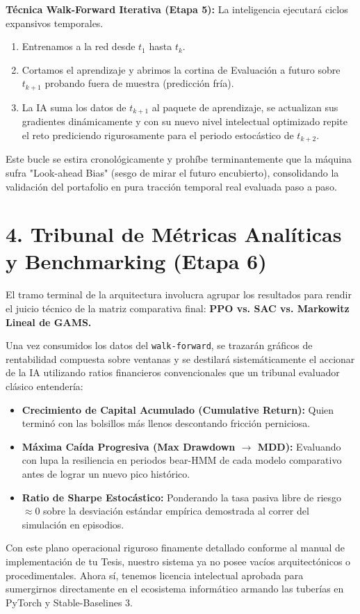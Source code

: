 \documentclass[11pt,a4paper]{article}
\begin{document}
\textbf{Técnica Walk-Forward Iterativa (Etapa 5):}
La inteligencia ejecutará ciclos expansivos temporales. 
\begin{enumerate}
    \item Entrenamos a la red desde $t_1$ hasta $t_k$.
    \item Cortamos el aprendizaje y abrimos la cortina de Evaluación a futuro sobre $t_{k+1}$ probando fuera de muestra (predicción fría).
    \item La IA suma los datos de $t_{k+1}$ al paquete de aprendizaje, se actualizan sus gradientes dinámicamente y con su nuevo nivel intelectual optimizado repite el reto prediciendo rigurosamente para el periodo estocástico de $t_{k+2}$.
\end{enumerate}
Este bucle se estira cronológicamente y prohíbe terminantemente que la máquina sufra "Look-ahead Bias" (sesgo de mirar el futuro encubierto), consolidando la validación del portafolio en pura tracción temporal real evaluada paso a paso.

\section{4. Tribunal de Métricas Analíticas y Benchmarking (Etapa 6)}
El tramo terminal de la arquitectura involucra agrupar los resultados para rendir el juicio técnico de la matriz comparativa final: \textbf{PPO vs. SAC vs. Markowitz Lineal de GAMS.}

Una vez consumidos los datos del \texttt{walk-forward}, se trazarán gráficos de rentabilidad compuesta sobre ventanas y se destilará sistemáticamente el accionar de la IA utilizando ratios financieros convencionales que un tribunal evaluador clásico entendería:
\begin{itemize}
    \item \textbf{Crecimiento de Capital Acumulado (Cumulative Return):} Quien terminó con las bolsillos más llenos descontando fricción perniciosa.
    \item \textbf{Máxima Caída Progresiva (Max Drawdown $\rightarrow$ MDD):} Evaluando con lupa la resiliencia en periodos bear-HMM de cada modelo comparativo antes de lograr un nuevo pico histórico.
    \item \textbf{Ratio de Sharpe Estocástico:} Ponderando la tasa pasiva libre de riesgo $\approx 0$ sobre la desviación estándar empírica demostrada al correr del simulación en episodios.
\end{itemize}

\vspace{5mm}
Con este plano operacional riguroso finamente detallado conforme al manual de implementación de tu Tesis, nuestro sistema ya no posee vacíos arquitectónicos o procedimentales. Ahora sí, tenemos licencia intelectual aprobada para sumergirnos directamente en el ecosistema informático armando las tuberías en PyTorch y Stable-Baselines 3.
\end{document}
